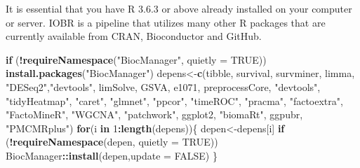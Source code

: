 \documentclass[
  12pt,
]{book}
\newenvironment{Shaded}{\begin{snugshade}}{\end{snugshade}}
\newcommand{\AttributeTok}[1]{\textcolor[rgb]{0.13,0.29,0.53}{#1}}
\newcommand{\ConstantTok}[1]{\textcolor[rgb]{0.56,0.35,0.01}{#1}}
\newcommand{\ControlFlowTok}[1]{\textcolor[rgb]{0.13,0.29,0.53}{\textbf{#1}}}
\newcommand{\DecValTok}[1]{\textcolor[rgb]{0.00,0.00,0.81}{#1}}
\newcommand{\FunctionTok}[1]{\textcolor[rgb]{0.13,0.29,0.53}{\textbf{#1}}}
\newcommand{\NormalTok}[1]{#1}
\newcommand{\OtherTok}[1]{\textcolor[rgb]{0.56,0.35,0.01}{#1}}
\newcommand{\SpecialCharTok}[1]{\textcolor[rgb]{0.81,0.36,0.00}{\textbf{#1}}}
\newcommand{\StringTok}[1]{\textcolor[rgb]{0.31,0.60,0.02}{#1}}
\begin{document}
It is essential that you have R 3.6.3 or above already installed on your computer or server. IOBR is a pipeline that utilizes many other R packages that are currently available from CRAN, Bioconductor and GitHub.

\begin{Shaded}
\begin{Highlighting}[]
\ControlFlowTok{if}\NormalTok{ (}\SpecialCharTok{!}\FunctionTok{requireNamespace}\NormalTok{(}\StringTok{"BiocManager"}\NormalTok{, }\AttributeTok{quietly =} \ConstantTok{TRUE}\NormalTok{)) }\FunctionTok{install.packages}\NormalTok{(}\StringTok{"BiocManager"}\NormalTok{)}
\NormalTok{depens}\OtherTok{\textless{}{-}}\FunctionTok{c}\NormalTok{(}\StringTok{\textquotesingle{}tibble\textquotesingle{}}\NormalTok{, }\StringTok{\textquotesingle{}survival\textquotesingle{}}\NormalTok{, }\StringTok{\textquotesingle{}survminer\textquotesingle{}}\NormalTok{, }\StringTok{\textquotesingle{}limma\textquotesingle{}}\NormalTok{, }\StringTok{"DESeq2"}\NormalTok{,}\StringTok{"devtools"}\NormalTok{, }\StringTok{\textquotesingle{}limSolve\textquotesingle{}}\NormalTok{, }\StringTok{\textquotesingle{}GSVA\textquotesingle{}}\NormalTok{, }\StringTok{\textquotesingle{}e1071\textquotesingle{}}\NormalTok{, }\StringTok{\textquotesingle{}preprocessCore\textquotesingle{}}\NormalTok{, }
          \StringTok{"devtools"}\NormalTok{, }\StringTok{"tidyHeatmap"}\NormalTok{, }\StringTok{"caret"}\NormalTok{, }\StringTok{"glmnet"}\NormalTok{, }\StringTok{"ppcor"}\NormalTok{,  }\StringTok{"timeROC"}\NormalTok{, }\StringTok{"pracma"}\NormalTok{, }\StringTok{"factoextra"}\NormalTok{, }
          \StringTok{"FactoMineR"}\NormalTok{, }\StringTok{"WGCNA"}\NormalTok{, }\StringTok{"patchwork"}\NormalTok{, }\StringTok{\textquotesingle{}ggplot2\textquotesingle{}}\NormalTok{, }\StringTok{"biomaRt"}\NormalTok{, }\StringTok{\textquotesingle{}ggpubr\textquotesingle{}}\NormalTok{, }\StringTok{"PMCMRplus"}\NormalTok{)}
\ControlFlowTok{for}\NormalTok{(i }\ControlFlowTok{in} \DecValTok{1}\SpecialCharTok{:}\FunctionTok{length}\NormalTok{(depens))\{}
\NormalTok{  depen}\OtherTok{\textless{}{-}}\NormalTok{depens[i]}
  \ControlFlowTok{if}\NormalTok{ (}\SpecialCharTok{!}\FunctionTok{requireNamespace}\NormalTok{(depen, }\AttributeTok{quietly =} \ConstantTok{TRUE}\NormalTok{))  BiocManager}\SpecialCharTok{::}\FunctionTok{install}\NormalTok{(depen,}\AttributeTok{update =} \ConstantTok{FALSE}\NormalTok{)}
\NormalTok{\}}
\end{Highlighting}
\end{Shaded}
\end{document}
